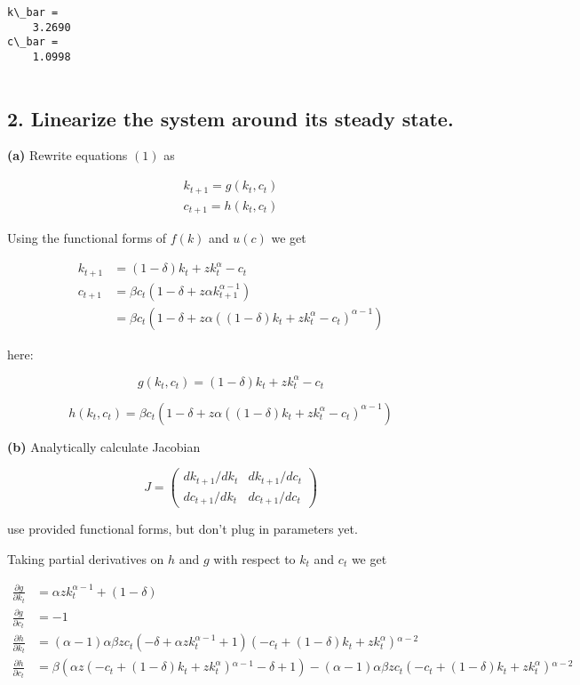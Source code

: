 \documentclass[10pt,notitlepage,onecolumn,aps,pra]{revtex4-1}
\begin{document}
    \begin{Verbatim}[commandchars=\\\{\}]
k\_bar =
    3.2690
c\_bar =
    1.0998


    \end{Verbatim}

    \hypertarget{linearize-the-system-around-its-steady-state.}{%
\subsection{2. Linearize the system around its steady
state.}\label{linearize-the-system-around-its-steady-state.}}

\textbf{(a)} Rewrite equations \((1)\) as

\[
\begin{array}{l}
k_{t+1}=g\left(k_{t}, c_{t}\right) \\
c_{t+1}=h\left(k_{t}, c_{t}\right)
\end{array}
\]

    Using the functional forms of \(f(k)\) and \(u(c)\) we get

\begin{align*}
k_{t+1} &=(1-\delta ) k_t+z k_t^{\alpha } -c_t\\
c_{t+1} &= \beta c_t \left(1-\delta+z \alpha k_{t+1}^{\alpha-1}\right)\\
 &= \beta c_t \left(1-\delta+z \alpha ((1-\delta ) k_t+z k_t^{\alpha } -c_t)^{\alpha-1}\right)
\end{align*}

here:

\[g(k_t, c_t) = (1-\delta ) k_t+z k_t^{\alpha } -c_t\]

\[h(k_t, c_t) = \beta c_t \left(1-\delta+z \alpha ((1-\delta ) k_t+z k_t^{\alpha } -c_t)^{\alpha-1}\right)\]

    \textbf{(b)} Analytically calculate Jacobian

\[J=\left(\begin{array}{ll}d k_{t+1} / d k_{t} & d k_{t+1} / d c_{t} \\ d c_{t+1} / d k_{t} & d c_{t+1} / d c_{t}\end{array}\right)\]

use provided functional forms, but don't plug in parameters yet.

    Taking partial derivatives on \(h\) and \(g\) with respect to \(k_t\)
and \(c_t\) we get

\begin{align*}
    \frac{\partial g }{\partial k_t} &= \alpha z k_t^{\alpha -1}+(1-\delta) \\ 
    \frac{\partial g }{\partial c_t} &=  -1 \\ 
    \frac{\partial h }{\partial k_t} &= (\alpha -1) \alpha  \beta  z c_t \left(-\delta +\alpha  z
   k_t^{\alpha -1}+1\right) \left(-c_t+(1-\delta ) k_t+z k_t^{\alpha
   }\right){}^{\alpha -2}\\
   \frac{\partial h }{\partial c_t} &= \beta  \left(\alpha  z \left(-c_t+(1-\delta ) k_t+z k_t^{\alpha
   }\right){}^{\alpha -1}-\delta +1\right)-(\alpha -1) \alpha  \beta
    z c_t \left(-c_t+(1-\delta ) k_t+z k_t^{\alpha
   }\right){}^{\alpha -2}
\end{align*}
\end{document}
